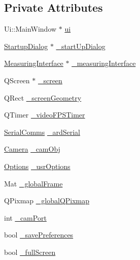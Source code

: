 \subsection*{Private Attributes}
\begin{DoxyCompactItemize}
\item 
Ui\+::\+Main\+Window $\ast$ \mbox{\hyperlink{class_main_window_a35466a70ed47252a0191168126a352a5}{ui}}
\item 
\mbox{\hyperlink{class_startup_dialog}{Startup\+Dialog}} $\ast$ \mbox{\hyperlink{class_main_window_a850dd2c4a3175dffc1ca0aff45f90df2}{\+\_\+start\+Up\+Dialog}}
\item 
\mbox{\hyperlink{class_measuring_interface}{Measuring\+Interface}} $\ast$ \mbox{\hyperlink{class_main_window_a1af24c9acb6190fbd2e94e9fd7e47fa5}{\+\_\+measuring\+Interface}}
\item 
Q\+Screen $\ast$ \mbox{\hyperlink{class_main_window_aaca1bb52c5de2823d0d2ebda6a074fed}{\+\_\+screen}}
\item 
Q\+Rect \mbox{\hyperlink{class_main_window_a87aaa571db28f88942b781c44eac7ba5}{\+\_\+screen\+Geometry}}
\item 
Q\+Timer \mbox{\hyperlink{class_main_window_a13da2145ec632c79dd1c61ec1bd7a792}{\+\_\+video\+F\+P\+S\+Timer}}
\item 
\mbox{\hyperlink{class_serial_comms}{Serial\+Comms}} \mbox{\hyperlink{class_main_window_a06b8d20af620251ae9bb2f4ffea9a472}{\+\_\+ard\+Serial}}
\item 
\mbox{\hyperlink{class_camera}{Camera}} \mbox{\hyperlink{class_main_window_a3b33eb0a1b29e1f1005e31279043d2b6}{\+\_\+cam\+Obj}}
\item 
\mbox{\hyperlink{struct_options}{Options}} \mbox{\hyperlink{class_main_window_a0f1a92e35aed746b3e7666e7d62b8605}{\+\_\+usr\+Options}}
\item 
Mat \mbox{\hyperlink{class_main_window_a69d1e60b19121dcf294a0b3085c18b31}{\+\_\+global\+Frame}}
\item 
Q\+Pixmap \mbox{\hyperlink{class_main_window_a9519bc24e6ce9e25bbfb4c9b71e34fb4}{\+\_\+global\+Q\+Pixmap}}
\item 
int \mbox{\hyperlink{class_main_window_a5e65a36ced82042fab3dfa4cb225072b}{\+\_\+cam\+Port}}
\item 
bool \mbox{\hyperlink{class_main_window_a7038f323814ea36cb1b8ae38a1843a9f}{\+\_\+save\+Preferences}}
\item 
bool \mbox{\hyperlink{class_main_window_a73ad23682185e721c6bb66991b0029b4}{\+\_\+full\+Screen}}
\item 

\end{DoxyCompactItemize}
